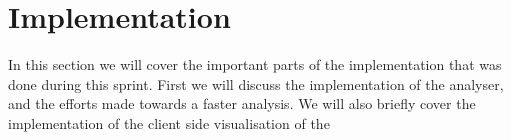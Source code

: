 \section{Implementation}

In this section we will cover the important parts of the implementation that was done during this sprint. First we will discuss the implementation of the analyser, and the efforts made towards a faster analysis. We will also briefly cover the implementation of the client side visualisation of the


